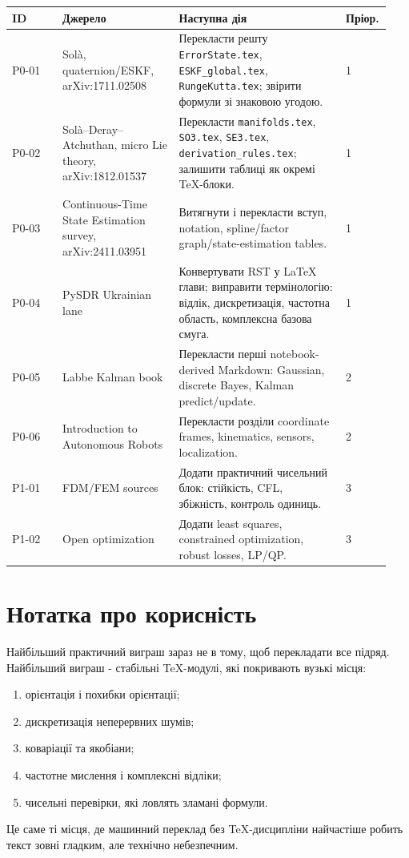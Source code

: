 \begin{longtable}{L{0.13\linewidth}L{0.30\linewidth}L{0.43\linewidth}L{0.08\linewidth}}
\toprule
ID & Джерело & Наступна дія & Пріор.\\
\midrule
P0-01 & Solà, quaternion/ESKF, arXiv:1711.02508 & Перекласти решту \texttt{ErrorState.tex}, \texttt{ESKF\_global.tex}, \texttt{RungeKutta.tex}; звірити формули зі знаковою угодою. & 1\\
P0-02 & Solà--Deray--Atchuthan, micro Lie theory, arXiv:1812.01537 & Перекласти \texttt{manifolds.tex}, \texttt{SO3.tex}, \texttt{SE3.tex}, \texttt{derivation\_rules.tex}; залишити таблиці як окремі TeX-блоки. & 1\\
P0-03 & Continuous-Time State Estimation survey, arXiv:2411.03951 & Витягнути і перекласти вступ, notation, spline/factor graph/state-estimation tables. & 1\\
P0-04 & PySDR Ukrainian lane & Конвертувати RST у LaTeX глави; виправити термінологію: відлік, дискретизація, частотна область, комплексна базова смуга. & 1\\
P0-05 & Labbe Kalman book & Перекласти перші notebook-derived Markdown: Gaussian, discrete Bayes, Kalman predict/update. & 2\\
P0-06 & Introduction to Autonomous Robots & Перекласти розділи coordinate frames, kinematics, sensors, localization. & 2\\
P1-01 & FDM/FEM sources & Додати практичний чисельний блок: стійкість, CFL, збіжність, контроль одиниць. & 3\\
P1-02 & Open optimization & Додати least squares, constrained optimization, robust losses, LP/QP. & 3\\
\bottomrule
\end{longtable}

\section{Нотатка про корисність}

Найбільший практичний виграш зараз не в тому, щоб перекладати все підряд. Найбільший виграш - стабільні TeX-модулі, які покривають вузькі місця:
\begin{enumerate}[leftmargin=2em]
\item орієнтація і похибки орієнтації;
\item дискретизація неперервних шумів;
\item коваріації та якобіани;
\item частотне мислення і комплексні відліки;
\item чисельні перевірки, які ловлять зламані формули.
\end{enumerate}

Це саме ті місця, де машинний переклад без TeX-дисципліни найчастіше робить текст зовні гладким, але технічно небезпечним.
